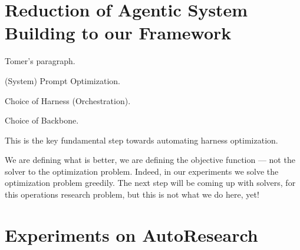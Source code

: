 \documentclass{article}
\newcommand{\J}{\mathcal{J}}
\newcommand{\one}{\mathbf{1}}
\begin{document}

\section{Reduction of Agentic System Building to our Framework}

Tomer's paragraph.

(System) Prompt Optimization.

Choice of Harness (Orchestration).

Choice of Backbone.

This is the key fundamental step towards automating harness optimization.

We are defining what is better, we are defining the objective function --- not the solver to the optimization problem. Indeed, in our experiments we solve the optimization problem greedily. The next step will be coming up with solvers, for this operations research problem, but this is not what we do here, yet!

\section{Experiments on AutoResearch}
\label{sec:experiments}
\end{document}
